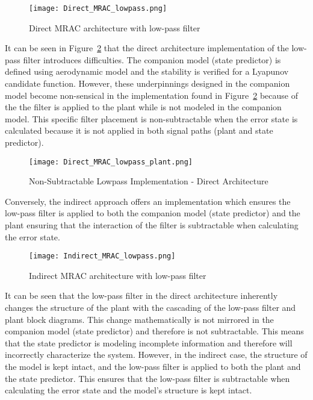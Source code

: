 \begin{figure}[h!]
 \centering
  \texttt{[image: Direct\_MRAC\_lowpass.png]}
  \caption{Direct \ac{MRAC} architecture with low-pass filter }
  \label{fig:direct_mrac_lowpass}
\end{figure}
 It can be seen in Figure~\ref{fig:direct_mrac_lowpass} that the direct architecture implementation of the low-pass filter introduces difficulties.  The companion model (state predictor) is defined using aerodynamic model and the stability is verified for a Lyapunov candidate function.  However, these underpinnings designed in the companion model become non-sensical in the implementation found in Figure~\ref{fig:direct_mrac_lowpass} because of the the filter is applied to the plant while is not modeled in the companion model.  This specific filter placement is non-subtractable when the error state is calculated because it is not applied in both signal paths (plant and state predictor).
\begin{figure}[h!]
 \centering
  \texttt{[image: Direct\_MRAC\_lowpass\_plant.png]}
  \caption{Non-Subtractable Lowpass Implementation - Direct Architecture}
  \label{fig:direct_mrac_lowpass}
\end{figure}

Conversely, the indirect approach offers an implementation which ensures the low-pass filter is applied to both the companion model (state predictor) and the plant ensuring that the interaction of the filter is subtractable when calculating the error state.
\begin{figure}[h!]
 \centering
  \texttt{[image: Indirect\_MRAC\_lowpass.png]}
  \caption{Indirect \ac{MRAC} architecture with low-pass filter }
  \label{fig:indirect_mrac_lowpass}
\end{figure}

It can be seen that the low-pass filter in the direct architecture inherently changes the structure of the plant with the cascading of the low-pass filter and plant block diagrams.  This change mathematically is not mirrored in the companion model (state predictor) and therefore is not subtractable.  This means that the state predictor is modeling incomplete information and therefore will incorrectly characterize the system.  However, in the indirect case, the structure of the model is kept intact, and the low-pass filter is applied to both the plant and the state predictor.  This ensures that the low-pass filter is subtractable when calculating the error state and the model's structure is kept intact.  

